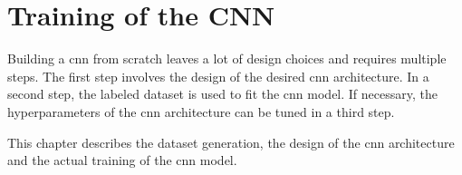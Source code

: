 \chapter{Training of the CNN}
\label{ch:training_of_the_cnn}

Building a \acrlong{cnn} from scratch leaves a lot of design choices and requires multiple steps.
The first step involves the design of the desired \acrshort{cnn} architecture.
In a second step, the labeled dataset is used to fit the \acrshort{cnn} model.
If necessary, the hyperparameters of the \acrshort{cnn} architecture can be tuned in a third step.

This chapter describes the dataset generation, the design of the \acrshort{cnn} architecture and the actual training of the \acrshort{cnn} model.




